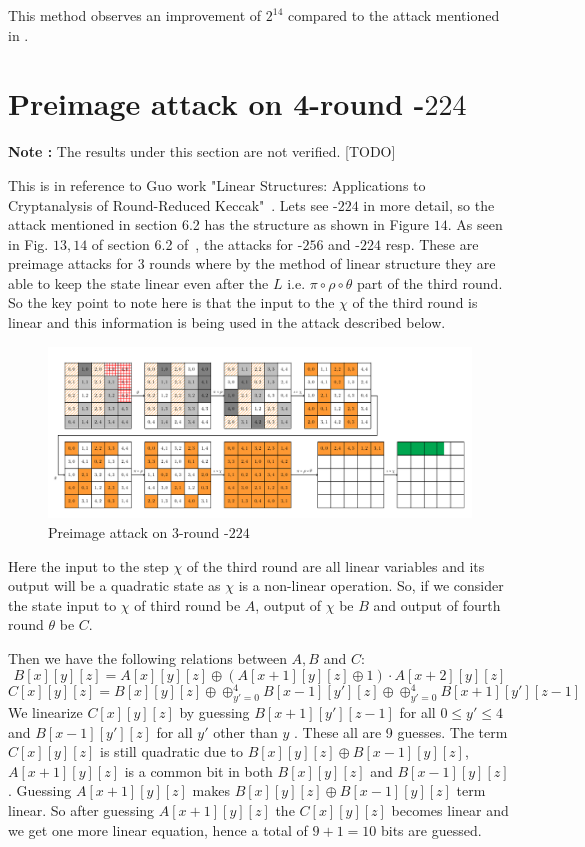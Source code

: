 This method observes an improvement of $2^{14}$ compared to the attack mentioned in \cite{guo2016linear}.

\section{Preimage attack on 4-round \KECCAK-$224$}
    
    \textbf{Note : } The results under this section are not verified. [TODO]
    
    This is in reference to Guo \etal work "Linear Structures: Applications to Cryptanalysis of Round-Reduced Keccak"~\cite{guo2016linear}. Lets see \KECCAK-$224$ in more detail, so the attack mentioned in section 6.2 has the structure as shown in Figure $14$.
    As seen in Fig. $13, 14$ of section 6.2 of~\cite{guo2016linear}, the attacks for \KECCAK-$256$ and \KECCAK-$224$ resp. These are preimage attacks for 3 rounds where by the method of linear structure they are able to keep the state linear even after the $L$ i.e. $\pi \circ \rho \circ \theta$ part of the third round. So the key point to note here is that the input to the $\chi$ of the third round is linear and this information is being used in the attack described below.
    \begin{figure}
        \includegraphics[width=\linewidth]{keccak224.png}
        \caption{Preimage attack on 3-round \KECCAK-$224$~\cite{guo2016linear}}
        \label{fig:keccak224}
    \end{figure}
    Here the input to the step $\chi$ of the third round are all linear variables and its output will be a quadratic state as $\chi$ is a non-linear operation.
    So, if we consider the state input to $\chi$ of third round be $A$, output of $\chi$ be $B$ and output of fourth round $\theta$ be $C$.
    
    Then we have the following relations between $A, B$ and $C$: 
    \[
			B[x][y][z] = A[x][y][z] \oplus (A[x+1][y][z] \oplus 1) \cdot A[x+2][y][z]
		\]
		\[
        C[x][y][z] = B[x][y][z] \oplus \oplus_{y' = 0}^{4} B[x-1][y'][z] \oplus \oplus_{y' = 0}^{4} B[x+1][y'][z-1]
    \]
    We linearize $C[x][y][z]$ by guessing $B[x+1][y'][z-1]$ for all $0 \leq y' \leq 4$ and $B[x-1][y'][z]$ for all $y'$ other than $y$ . These all are 9 guesses.
    The term $C[x][y][z]$ is still quadratic due to $B[x][y][z] \oplus B[x-1][y][z]$, $A[x+1][y][z]$ is a common bit in both $B[x][y][z]$ and $B[x-1][y][z]$. Guessing $A[x+1][y][z]$ makes $B[x][y][z] \oplus B[x-1][y][z]$ term linear. So after guessing $A[x+1][y][z]$ the $C[x][y][z]$ becomes linear and we get one more linear equation, hence a total of $9+1 = 10$ bits are guessed.

